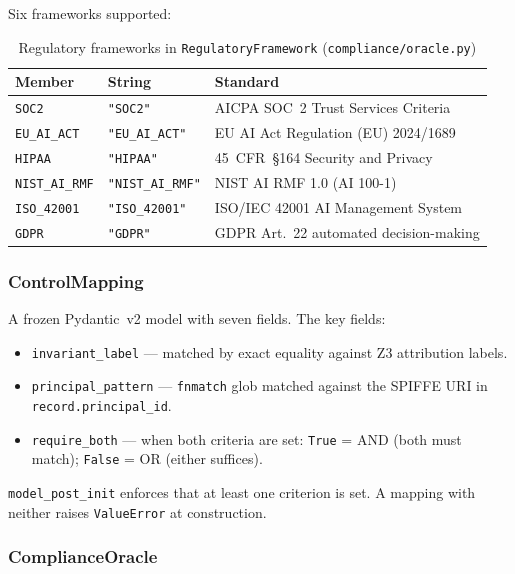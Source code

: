 \documentclass[12pt,a4paper,oneside]{report}
\newcommand{\fname}[1]{\texttt{#1}}          %
\newcommand{\code}[1]{\texttt{#1}}           %
\begin{document}
Six frameworks supported:

\begin{table}[h]
\centering\small
\begin{tabular}{@{} l l l @{}}
\toprule
\textbf{Member} & \textbf{String} & \textbf{Standard} \\
\midrule
\code{SOC2}         & \code{"SOC2"}         & AICPA SOC~2 Trust Services Criteria \\
\code{EU\_AI\_ACT}  & \code{"EU\_AI\_ACT"}  & EU AI Act Regulation (EU) 2024/1689 \\
\code{HIPAA}        & \code{"HIPAA"}        & 45~CFR~\S164 Security and Privacy \\
\code{NIST\_AI\_RMF}& \code{"NIST\_AI\_RMF"}& NIST AI RMF 1.0 (AI 100-1) \\
\code{ISO\_42001}   & \code{"ISO\_42001"}   & ISO/IEC 42001 AI Management System \\
\code{GDPR}         & \code{"GDPR"}         & GDPR Art.~22 automated decision-making \\
\bottomrule
\end{tabular}
\caption{Regulatory frameworks in \code{RegulatoryFramework}
  (\fname{compliance/oracle.py})}
\end{table}

\subsubsection{ControlMapping}

A frozen Pydantic~v2 model with seven fields.  The key fields:

\begin{itemize}
  \item \code{invariant\_label} --- matched by exact equality against Z3
        attribution labels.
  \item \code{principal\_pattern} --- \code{fnmatch} glob matched against the
        SPIFFE URI in \code{record.principal\_id}.
  \item \code{require\_both} --- when both criteria are set: \code{True} =
        AND (both must match); \code{False} = OR (either suffices).
\end{itemize}

\code{model\_post\_init} enforces that at least one criterion is set.  A
mapping with neither raises \code{ValueError} at construction.

\subsubsection{ComplianceOracle}
\end{document}
